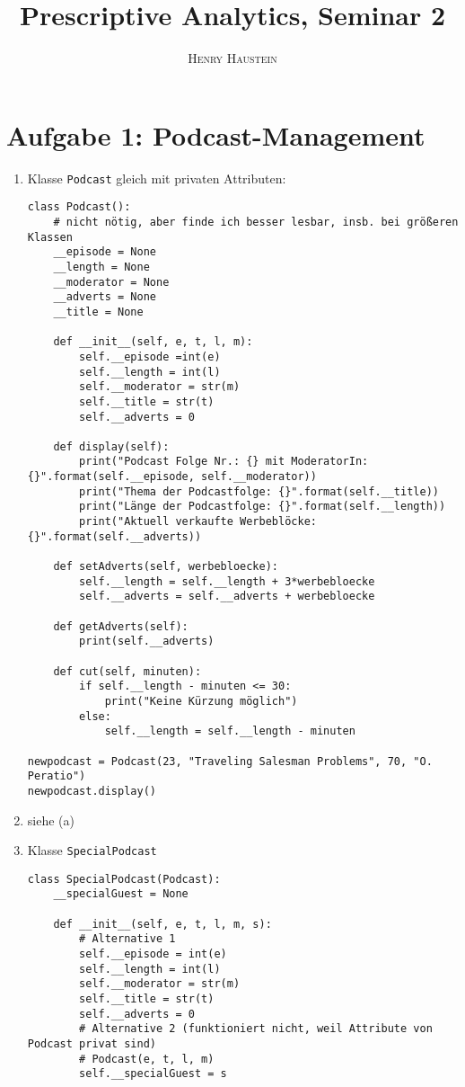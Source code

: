 \documentclass{article}
\title{\textbf{Prescriptive Analytics, Seminar 2}}
\author{\textsc{Henry Haustein}}
\date{}
\begin{document}
	\maketitle
	
	\section*{Aufgabe 1: Podcast-Management}
	\begin{enumerate}[label=(\alph*)]
		\item Klasse \texttt{Podcast} gleich mit privaten Attributen:
		\begin{lstlisting}
class Podcast():
	# nicht nötig, aber finde ich besser lesbar, insb. bei größeren Klassen
	__episode = None
	__length = None
	__moderator = None
	__adverts = None
	__title = None

	def __init__(self, e, t, l, m):
		self.__episode =int(e)
		self.__length = int(l)
		self.__moderator = str(m)
		self.__title = str(t)
		self.__adverts = 0

	def display(self):
		print("Podcast Folge Nr.: {} mit ModeratorIn: {}".format(self.__episode, self.__moderator))
		print("Thema der Podcastfolge: {}".format(self.__title))
		print("Länge der Podcastfolge: {}".format(self.__length))
		print("Aktuell verkaufte Werbeblöcke: {}".format(self.__adverts))

	def setAdverts(self, werbebloecke):
		self.__length = self.__length + 3*werbebloecke
		self.__adverts = self.__adverts + werbebloecke

	def getAdverts(self):
		print(self.__adverts)

	def cut(self, minuten):
		if self.__length - minuten <= 30:
			print("Keine Kürzung möglich")
		else:
			self.__length = self.__length - minuten

newpodcast = Podcast(23, "Traveling Salesman Problems", 70, "O. Peratio")
newpodcast.display()
		\end{lstlisting}
		\item siehe (a)
		\item Klasse \texttt{SpecialPodcast}
		\begin{lstlisting}
class SpecialPodcast(Podcast):
	__specialGuest = None

	def __init__(self, e, t, l, m, s):
		# Alternative 1
		self.__episode = int(e)
		self.__length = int(l)
		self.__moderator = str(m)
		self.__title = str(t)
		self.__adverts = 0
		# Alternative 2 (funktioniert nicht, weil Attribute von Podcast privat sind)
		# Podcast(e, t, l, m)
		self.__specialGuest = s


\end{lstlisting}
\end{enumerate}
\end{document}
